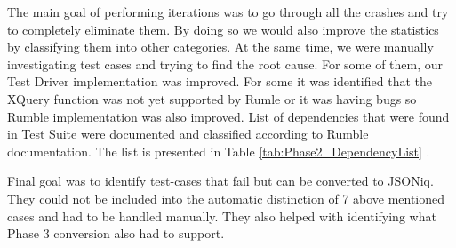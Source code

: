 The main goal of performing iterations was to go through all the crashes and try to completely eliminate them. By doing so we would also improve the statistics by classifying them into other categories. At the same time, we were manually investigating test cases and trying to find the root cause. For some of them, our Test Driver implementation was improved. For some it was identified that the XQuery function was not yet supported by Rumle or it was having bugs so Rumble implementation was also improved. List of dependencies that were found in Test Suite were documented and classified according to Rumble documentation. The list is presented in Table \ref{tab:Phase2_DependencyList} . 

Final goal was to identify test-cases that fail but can be converted to JSONiq. They could not be included into the automatic distinction of 7 above mentioned cases and had to be handled manually. They also helped with identifying what Phase 3 conversion also had to support.

